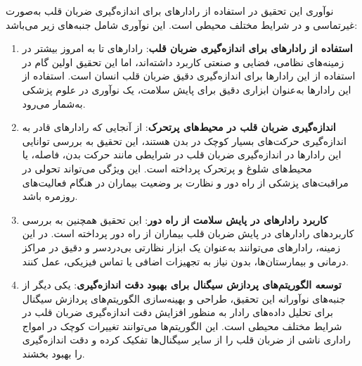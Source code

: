 نوآوری این تحقیق در استفاده از رادارهای   برای اندازه‌گیری ضربان قلب به‌صورت غیرتماسی و در شرایط مختلف محیطی است. این نوآوری شامل جنبه‌های زیر می‌باشد:
\begin{enumerate}
    \item \textbf{استفاده از رادارهای  برای اندازه‌گیری ضربان قلب}: رادارهای  تا به امروز بیشتر در زمینه‌های نظامی، فضایی و صنعتی کاربرد داشته‌اند، اما این تحقیق اولین گام در استفاده از این رادارها برای اندازه‌گیری دقیق ضربان قلب انسان است. استفاده از این رادارها به‌عنوان ابزاری دقیق برای پایش سلامت، یک نوآوری در علوم پزشکی به‌شمار می‌رود.
    \item \textbf{اندازه‌گیری ضربان قلب در محیط‌های پرتحرک}: از آنجایی که رادارهای  قادر به اندازه‌گیری حرکت‌های بسیار کوچک در بدن هستند، این تحقیق به بررسی توانایی این رادارها در اندازه‌گیری ضربان قلب در شرایطی مانند حرکت بدن، فاصله، یا محیط‌های شلوغ و پرتحرک پرداخته است. این ویژگی می‌تواند تحولی در مراقبت‌های پزشکی از راه دور و نظارت بر وضعیت بیماران در هنگام فعالیت‌های روزمره باشد.
    \item \textbf{کاربرد رادارهای  در پایش سلامت از راه دور}: این تحقیق همچنین به بررسی کاربردهای رادارهای  در پایش ضربان قلب بیماران از راه دور پرداخته است. در این زمینه، رادارهای  می‌توانند به‌عنوان یک ابزار نظارتی بی‌دردسر و دقیق در مراکز درمانی و بیمارستان‌ها، بدون نیاز به تجهیزات اضافی یا تماس فیزیکی، عمل کنند.
    \item \textbf{توسعه الگوریتم‌های پردازش سیگنال برای بهبود دقت اندازه‌گیری}: یکی دیگر از جنبه‌های نوآورانه این تحقیق، طراحی و بهینه‌سازی الگوریتم‌های پردازش سیگنال برای تحلیل داده‌های رادار  به منظور افزایش دقت اندازه‌گیری ضربان قلب در شرایط مختلف محیطی است. این الگوریتم‌ها می‌توانند تغییرات کوچک در امواج راداری ناشی از ضربان قلب را از سایر سیگنال‌ها تفکیک کرده و دقت اندازه‌گیری را بهبود بخشند.
\end{enumerate}
